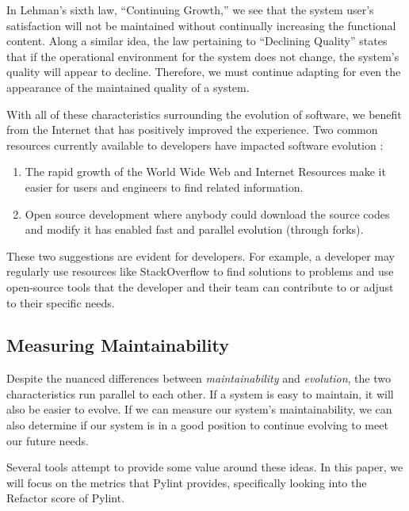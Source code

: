 \documentclass[12pt,conference]{IEEEtran}
\begin{document}
In Lehman's sixth law, ``Continuing Growth,'' we see that the system user's satisfaction will not be maintained without continually increasing the functional content. Along a similar idea, the law pertaining to ``Declining Quality'' states that if the operational environment for the system does not change, the system's quality will appear to decline. Therefore, we must continue adapting for even the appearance of the maintained quality of a system.

With all of these characteristics surrounding the evolution of software, we benefit from the Internet that has positively improved the experience. Two common resources currently available to developers have impacted software evolution \cite{wiki:software-evolution}:

\vspace{0.25cm}

\begin{enumerate}
    \item The rapid growth of the World Wide Web and Internet Resources make it easier for users and engineers to find related information.
    \item Open source development where anybody could download the source codes and modify it has enabled fast and parallel evolution (through forks).
\end{enumerate}

\vspace{0.25cm}

These two suggestions are evident for developers. For example, a developer may regularly use resources like StackOverflow to find solutions to problems and use open-source tools that the developer and their team can contribute to or adjust to their specific needs.

\subsection{Measuring Maintainability}

Despite the nuanced differences between \textit{maintainability} and \textit{evolution}, the two characteristics run parallel to each other. If a system is easy to maintain, it will also be easier to evolve. If we can measure our system's maintainability, we can also determine if our system is in a good position to continue evolving to meet our future needs.

Several tools attempt to provide some value around these ideas. In this paper, we will focus on the metrics that Pylint provides, specifically looking into the Refactor score of Pylint.
\end{document}

